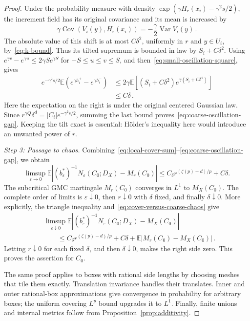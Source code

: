 \documentclass[11pt,letterpaper]{article}
\newcommand{\E}{\mathbb E}
\newcommand{\eps}{\varepsilon}
\DeclareMathOperator{\Cov}{Cov}
\DeclareMathOperator{\Var}{Var}
\theoremstyle{definition}
\theoremstyle{remark}
\numberwithin{equation}{section}
\begin{document}
\begin{proof}
Under the probability measure with density $\exp(\gamma H_r(x_i)-\gamma^2s/2)$, the increment field has its original covariance and its mean is increased by
\begin{equation*}
 \gamma\Cov(V_i(y),H_r(x_i))
 =-\frac{\gamma}{2}\Var V_i(y)\,.
\end{equation*}
The absolute value of this shift is at most $C\delta^2$, uniformly in $r$ and $y\in U_i$, by~\eqref{eq:k-bound}. Thus its tilted supremum is bounded in law by $S_i+C\delta^2$. Using $e^{\gamma v}-e^{\gamma u}\le2\gamma S e^{\gamma S}$ for $-S\le u\le v\le S$, and then~\eqref{eq:small-oscillation-square}, gives
\begin{align*}
 e^{-\gamma^2s/2}\E\left(e^{\gamma h_i^+}-e^{\gamma h_i^-}\right)
 &\le 2\gamma\E\left[(S_i+C\delta^2)e^{\gamma(S_i+C\delta^2)}\right]\\
 &\le C\delta\,.
\end{align*}
Here the expectation on the right is under the original centered Gaussian law. Since $r^{\gamma Q}\delta^d=|C_i|e^{-\gamma^2s/2}$, summing the last bound proves~\eqref{eq:coarse-oscillation-gap}. Keeping the tilt exact is essential: H\"older's inequality here would introduce an unwanted power of $r$.

\emph{Step 3: Passage to chaos.}
Combining~\eqref{eq:local-cover-sum}--\eqref{eq:coarse-oscillation-gap}, we obtain
\begin{equation}\label{eq:cover-versus-coarse-chaos}
 \limsup_{\eps\to0}
 \E\left|(b_\eps^*)^{-1}N_\eps(C_0;D_X)-M_r(C_0)\right|
 \le C_\delta r^{(\zeta(p)-d)/p}+C\delta.
\end{equation}
The subcritical GMC martingale $M_r(C_0)$ converges in $L^1$ to $M_X(C_0)$. The complete order of limits is $\eps\downarrow0$, then $r\downarrow0$ with $\delta$ fixed, and finally $\delta\downarrow0$. More explicitly, the triangle inequality and~\eqref{eq:cover-versus-coarse-chaos} give
\begin{align*}
 &\limsup_{\eps\downarrow0}\E\left|(b_\eps^*)^{-1}N_\eps(C_0;D_X)-M_X(C_0)\right|\\
 &\qquad\le C_\delta r^{(\zeta(p)-d)/p}+C\delta+\E|M_r(C_0)-M_X(C_0)|\,.
\end{align*}
Letting $r\downarrow0$ for each fixed $\delta$, and then $\delta\downarrow0$, makes the right side zero. This proves the assertion for $C_0$.

The same proof applies to boxes with rational side lengths by choosing meshes that tile them exactly. Translation invariance handles their translates. Inner and outer rational-box approximations give convergence in probability for arbitrary boxes; the uniform covering $L^p$ bound upgrades it to $L^1$. Finally, finite unions and internal metrics follow from Proposition~\ref{prop:additivity}.
\end{proof}
\end{document}
